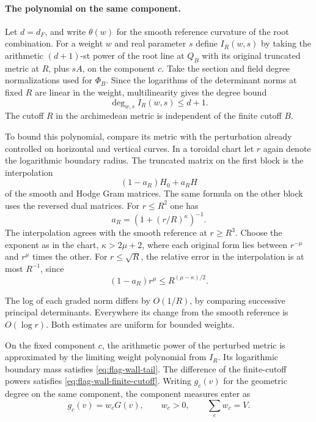 \paragraph{The polynomial on the same component.}
Let \(d=d_F\), and write \(\theta(w)\) for the smooth reference
curvature of the root combination. For a weight \(w\) and real
parameter \(s\) define \(I_R(w,s)\) by taking the arithmetic
\((d+1)\)-st power of the root line at \(Q_B\) with its original
truncated metric at \(R\), plus \(sA\), on the component \(c\).
Take the section and field degree normalizations used for
\(\Phi_B\). Since the logarithms of the determinant norms at fixed \(R\)
are linear in the weight, multilinearity gives the degree bound
\[
                      \deg_{w,s} I_R(w,s)\le d+1 .
\] The
cutoff \(R\) in the archimedean metric is independent of the
finite cutoff \(B\).

To bound this polynomial, compare its metric with the perturbation already controlled on horizontal and vertical curves. In a toroidal
chart let \(r\) again denote the logarithmic boundary radius.
The truncated matrix on the first block is the interpolation
\[
 (1-a_R)H_0+a_R H
\]
of the smooth and Hodge Gram matrices.
The same formula on the other block uses the reversed dual
matrices. For \(r\le R^2\) one has
\[
 a_R=(1+(r/R)^\kappa)^{-1}.
\]
The interpolation agrees with
the smooth reference at \(r\ge R^3\). Choose the exponent as
in the chart, \(\kappa>2\mu+2\), where each original form lies
between \(r^{-\mu}\) and \(r^\mu\) times the other. For
\(r\le\sqrt R\), the relative error in the interpolation is at
most \(R^{-1}\), since
\[
 (1-a_R)r^\mu\le R^{(\mu-\kappa)/2}.
\]

The log of each graded norm differs by \(O(1/R)\), by comparing
successive principal determinants. Everywhere its change from
the smooth reference is \(O(\log r)\). Both estimates are
uniform for bounded weights. \label{cor:flag-wall-polynomial-1}

\begin{proposition}
\label{prop:arithmetic-wall-polynomial}
On the fixed component \(c\), the arithmetic power of the
perturbed metric is approximated by the limiting weight polynomial
from \(I_R\). Its logarithmic boundary mass satisfies
\eqref{eq:flag-wall-tail}. The difference of the finite-cutoff
powers satisfies \eqref{eq:flag-wall-finite-cutoff}. Writing \(g_c(v)\) for the geometric degree on the same component, the component measures enter as
\[
 g_c(v)=w_cG(v),\qquad w_c>0,\qquad \sum_c w_c=V.
\]

\end{proposition}

